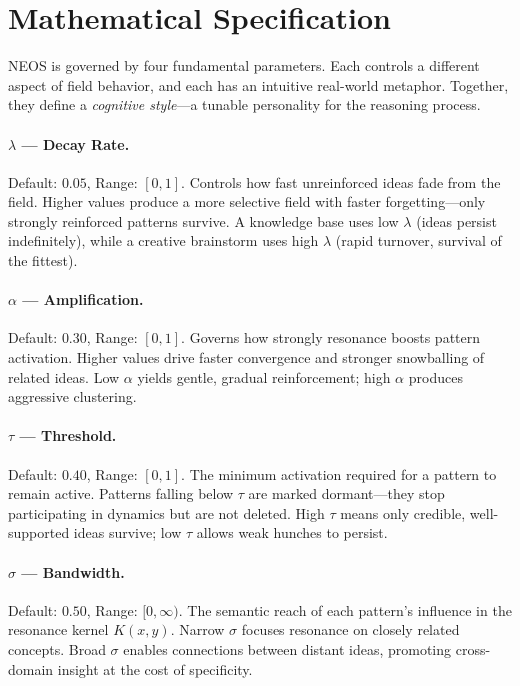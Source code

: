\section{Mathematical Specification}\label{sec:math}

NEOS is governed by four fundamental parameters. Each controls a different aspect of field behavior, and each has an intuitive real-world metaphor. Together, they define a \emph{cognitive style}---a tunable personality for the reasoning process.

\paragraph{$\lambda$ --- Decay Rate.}
Default: $0.05$, Range: $[0,1]$.
Controls how fast unreinforced ideas fade from the field. Higher values produce a more selective field with faster forgetting---only strongly reinforced patterns survive. A knowledge base uses low $\lambda$ (ideas persist indefinitely), while a creative brainstorm uses high $\lambda$ (rapid turnover, survival of the fittest).

\paragraph{$\alpha$ --- Amplification.}
Default: $0.30$, Range: $[0,1]$.
Governs how strongly resonance boosts pattern activation. Higher values drive faster convergence and stronger snowballing of related ideas. Low $\alpha$ yields gentle, gradual reinforcement; high $\alpha$ produces aggressive clustering.

\paragraph{$\tau$ --- Threshold.}
Default: $0.40$, Range: $[0,1]$.
The minimum activation required for a pattern to remain active. Patterns falling below $\tau$ are marked dormant---they stop participating in dynamics but are not deleted. High $\tau$ means only credible, well-supported ideas survive; low $\tau$ allows weak hunches to persist.

\paragraph{$\sigma$ --- Bandwidth.}
Default: $0.50$, Range: $[0,\infty)$.
The semantic reach of each pattern's influence in the resonance kernel $K(x,y)$. Narrow $\sigma$ focuses resonance on closely related concepts. Broad $\sigma$ enables connections between distant ideas, promoting cross-domain insight at the cost of specificity.

